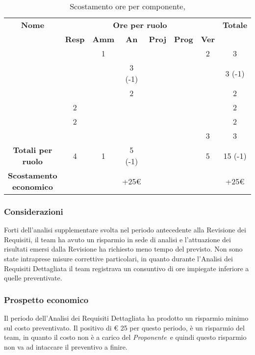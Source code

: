 \begin{table}[H]
	\begin{center}
		\begin{tabular}{|c|c|c|c|c|c|c|c|}
			\hline
			\textbf{Nome} & \multicolumn{6}{c|}{\textbf{Ore per ruolo}} & \textbf{Totale} \\\cline{2-7}
			& \textbf{Resp} & \textbf{Amm} & \textbf{An} & \textbf{Proj} & \textbf{Prog} & \textbf{Ver} & \\
			\hline
			\MC			&		&	1	&	 	&		&		&	2 	&	 3	\\
			\hline
			\AN			&		&		&	3 (-1) 	&	 	&		&	 	& 	 3 (-1)	\\
			\hline
			\DAN		&		&	 	&	2 	&		&		&		&	 2	\\
			\hline
			\AS			&	2	&	 	&	  	&		&	 	& 		&	 2	\\
			\hline
			\NS 		&	2	&		&	 	&		&		& 		&	 2	\\
			\hline
			\DS			& 		&	 	&	 	&		&		&	3 	&	 3	\\
			\hline
			\textbf{Totali per ruolo}	& 	4	&	1	&	5 (-1)	&		&		&	5	&	15 (-1)	\\
			\hline
			\textbf{Scostamento economico}	& 		&		&	+25€	&		&		&	&	+25€	\\
			\hline
		\end{tabular}
	\end{center}
	\caption{Scostamento ore per componente, \ARD}
\end{table}

\subsubsection{Considerazioni}
Forti dell'analisi supplementare svolta nel periodo antecedente alla Revisione dei Requisiti, il team ha avuto un risparmio in sede di analisi e l'attuazione dei risultati emersi dalla Revisione ha richiesto meno tempo del previsto. Non sono state intraprese misure correttive particolari, in quanto durante l'Analisi dei Requisiti Dettagliata il team registrava un consuntivo di ore impiegate inferiore a quelle preventivate.

\subsubsection{Prospetto economico}
Il periodo dell'Analisi dei Requisiti Dettagliata ha prodotto un risparmio minimo sul costo preventivato. Il positivo di € 25 per questo periodo, è un risparmio del team, in quanto il costo non è a carico del \textit{Proponente}\ e quindi questo risparmio non va ad intaccare il preventivo a finire.

